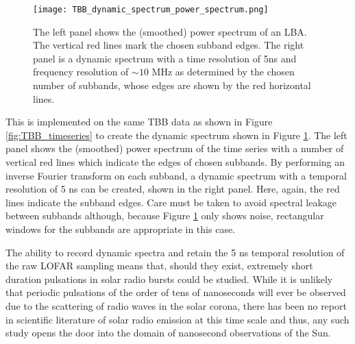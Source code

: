\begin{figure}[ht]
\centering
\texttt{[image: TBB\_dynamic\_spectrum\_power\_spectrum.png]}
\caption[A dynamic spectrum generated with TBB data from I-LOFAR.]{The left panel shows the (smoothed) power spectrum of an LBA. The vertical red lines mark the chosen subband edges. The right panel is a dynamic spectrum with a time resolution of 5ns and frequency resolution of $\sim 10$ MHz as determined by the chosen number of subbands, whose edges are shown by the red horizontal lines.}
\label{fig:TBB_dynamicspectrum}
\end{figure}

This is implemented on the same TBB data as shown in Figure \ref{fig:TBB_timeseries} to create the dynamic spectrum shown in Figure \ref{fig:TBB_dynamicspectrum}. The left panel shows the (smoothed) power spectrum of the time series with a number of vertical red lines which indicate the edges of chosen subbands. By performing an inverse Fourier transform on each subband, a dynamic spectrum with a temporal resolution of 5 ns can be created, shown in the right panel. Here, again, the red lines indicate the subband edges. Care must be taken to avoid spectral leakage between subbands although, because Figure \ref{fig:TBB_dynamicspectrum} only shows noise, rectangular windows for the subbands are appropriate in this case.
 
The ability to record dynamic spectra and retain the 5 ns temporal resolution of the raw LOFAR sampling means that, should they exist, extremely short duration pulsations in solar radio bursts could be studied. While it is unlikely that periodic pulsations of the order of tens of nanoseconds will ever be observed due to the scattering of radio waves in the solar corona, there has been no report in scientific literature of solar radio emission at this time scale and thus, any such study opens the door into the domain of nanosecond observations of the Sun.


